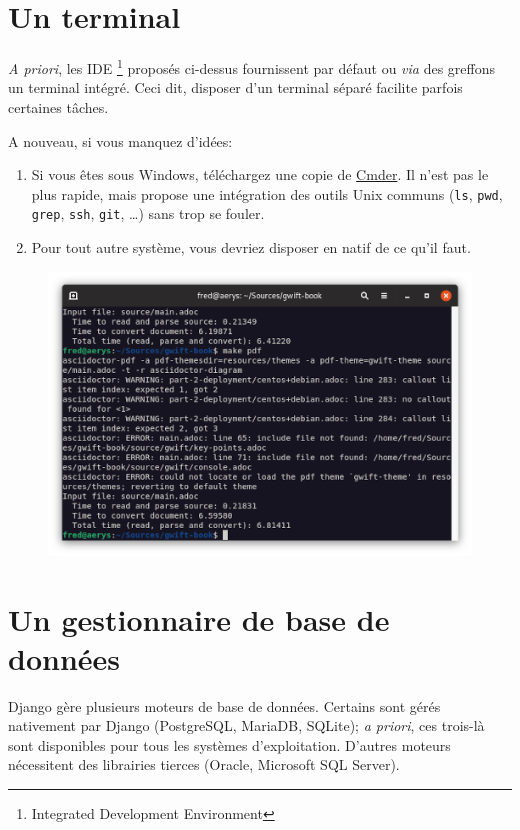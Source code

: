 \documentclass[11pt]{amsbook}
\begin{document}
\hypertarget{x-un-terminal}{\section{Un terminal}}
\emph{A priori}, les IDE \footnote{Integrated Development Environment} proposés ci-dessus fournissent par défaut ou \emph{via} des greffons un terminal intégré.
Ceci dit, disposer d’un terminal séparé facilite parfois certaines tâches.


A nouveau, si vous manquez d’idées:


\begin{enumerate}

\item{Si vous êtes sous Windows, téléchargez une copie de \href{https://cmder.net/}{Cmder}. Il n’est pas le plus rapide, mais propose une intégration des outils Unix communs (\texttt{ls}, \texttt{pwd}, \texttt{grep}, \texttt{ssh}, \texttt{git}, …​) sans trop se fouler.}

\item{Pour tout autre système, vous devriez disposer en natif de ce qu’il faut.}

\end{enumerate}


\begin{figure}[h]{}
\centering\includegraphics[width=2.5truein]{images/environment/terminal.png}
\caption{}

\end{figure}

\hypertarget{x-un-gestionnaire-de-base-de-données}{\section{Un gestionnaire de base de données}}
Django gère plusieurs moteurs de base de données.
Certains sont gérés nativement par Django (PostgreSQL, MariaDB, SQLite); \emph{a priori}, ces trois-là sont disponibles pour tous les systèmes d’exploitation. D’autres moteurs nécessitent des librairies tierces (Oracle, Microsoft SQL Server).
\end{document}
